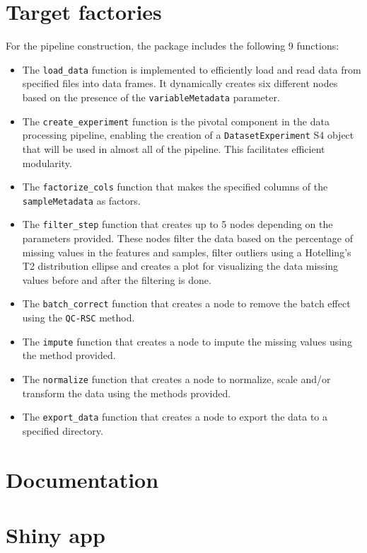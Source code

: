 \documentclass[ENG, BIB]{TFUOC}%
\begin{document}
\section{Target factories}
For the pipeline construction, the package includes the following 9 functions:
\begin{itemize}
    \item The \texttt{load\_data} function is implemented to efficiently load and read data from specified files into data frames. It dynamically creates six different nodes based on the presence of the \texttt{variableMetadata} parameter.
    \item The \texttt{create\_experiment} function is the pivotal component in the data processing pipeline, enabling the creation of a \texttt{DatasetExperiment} S4 object that will be used in almost all of the pipeline. This facilitates efficient modularity.
    \item The \texttt{factorize\_cols} function that makes the specified columns of the \texttt{sampleMetadata} as factors.
    \item The \texttt{filter\_step} function that creates up to 5 nodes depending on the parameters provided. These nodes filter the data based on the percentage of missing values in the features and samples, filter outliers using a Hotelling's T2 distribution ellipse and creates a plot for visualizing the data missing values before and after the filtering is done.
    \item The \texttt{batch\_correct} function that creates a node to remove the batch effect using the \texttt{QC-RSC} method.
    \item The \texttt{impute} function that creates a node to impute the missing values using the method provided.
    \item The \texttt{normalize} function that creates a node to normalize, scale and/or transform the data using the methods provided.
    \item The \texttt{export\_data} function that creates a node to export the data to a specified directory.
\end{itemize}

\section{Documentation}


\section{Shiny app}
 
\end{document}
